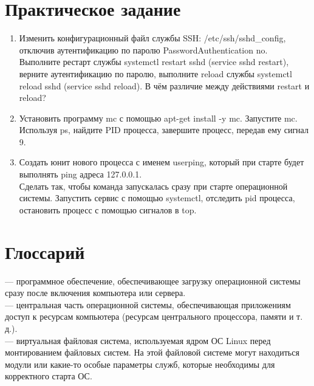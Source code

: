 \documentclass[14pt, a4paper]{article}
\begin{document}
\newpage

\section*{Практическое задание} 

\begin{enumerate}
    \item Изменить конфигурационный файл службы SSH: /etc/ssh/sshd\_config, отключив
    аутентификацию по паролю PasswordAuthentication no. Выполните рестарт службы \colorbox{backcolour}{systemctl
    restart sshd (service sshd restart)}, верните аутентификацию по паролю, выполните
    reload службы \colorbox{backcolour}{systemctl} \colorbox{backcolour}{reload sshd (service sshd reload)}. В чём различие между
    действиями restart и reload?
    \item Установить программу mc с помощью apt-get install -y mc. Запустите mc. Используя ps, найдите
    PID процесса, завершите процесс, передав ему сигнал 9.
    \item Создать юнит нового процесса с именем userping, который при старте будет выполнять ping
    адреса 127.0.0.1.\\
    Сделать так, чтобы команда запускалась сразу при старте операционной системы.
    Запустить сервис с помощью systemctl, отследить pid процесса, остановить процесс с
    помощью сигналов в top.
\end{enumerate}

\section*{Глоссарий} 

\href{https://ru.wikipedia.org/wiki/Загрузчик_операционной_системы}{} — программное обеспечение, обеспечивающее загрузку операционной системы сразу
после включения компьютера или сервера.\\

\noindent \href{https://ru.wikipedia.org/wiki/Ядро_Linux}{} — центральная часть операционной системы, обеспечивающая приложениям доступ к
ресурсам компьютера (ресурсам центрального процессора, памяти и т. д.).\\

\noindent \href{https://ru.wikipedia.org/wiki/Initrd}{} — виртуальная файловая система, используемая ядром ОС Linux перед монтированием
файловых систем. На этой файловой системе могут находиться модули или какие-то особые
параметры служб, которые необходимы для корректного старта ОС.\\
\end{document}
